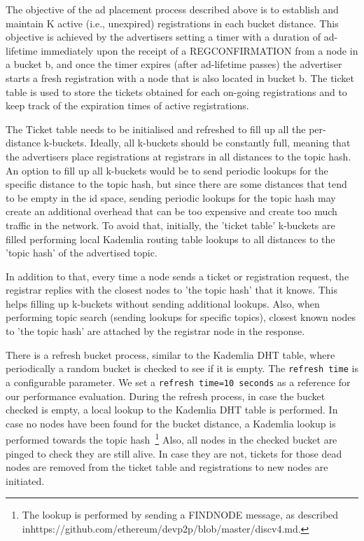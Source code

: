 The objective of the ad placement process described above is to establish and maintain K active (i.e., unexpired) registrations in each bucket distance. This objective is achieved by the advertisers setting a timer with a duration of ad-lifetime immediately upon the receipt of a REGCONFIRMATION from a node in a bucket b, and once the timer expires (after ad-lifetime passes) the advertiser starts a fresh registration with a node that is also located in bucket b. The ticket table is used to store the tickets obtained for each on-going registrations and to keep track of the expiration times of active registrations.


The Ticket table needs to be initialised and refreshed to fill up all the per-distance k-buckets. 
Ideally,  all k-buckets should be constantly full,  meaning that the advertisers place registrations at registrars in all distances to the topic hash. 
An option to fill up all k-buckets would be to send periodic lookups for the specific distance to the topic hash, but since there are some distances that tend to be empty in the id space,  sending periodic lookups for the topic hash may create an additional overhead that can be too expensive and create too much traffic in the network. To avoid that, initially, the 'ticket table' k-buckets are filled performing local Kademlia routing table lookups to all distances to the 'topic hash' of the advertised topic.

In addition to that, every time a node sends a ticket or registration request, the registrar replies with the closest nodes to 'the topic hash' that it knows. This helps filling up k-buckets without sending additional lookups. 
Also, when performing topic search (sending lookups for specific topics),  closest known nodes to 'the topic hash' are attached by the registrar node in the response.

There is  a refresh bucket process, similar to the Kademlia DHT table,  where periodically a random bucket is checked to see if it is empty.
The \texttt{refresh time} is a configurable parameter. 
We set a \texttt{refresh time=10 seconds} as a reference for our performance evaluation.
During the refresh process,  in case the bucket checked is empty, 
a local lookup to the Kademlia DHT table is performed. 
In case no nodes have been found for the bucket distance,  a Kademlia lookup is performed towards the topic hash~\footnote{The lookup is performed by sending a FINDNODE message,  as described inhttps://github.com/ethereum/devp2p/blob/master/discv4.md.}
Also, all nodes in the checked bucket are pinged to check they are still alive. 
In case they are not, tickets for those dead nodes are removed from the ticket table and registrations to new nodes are initiated.

